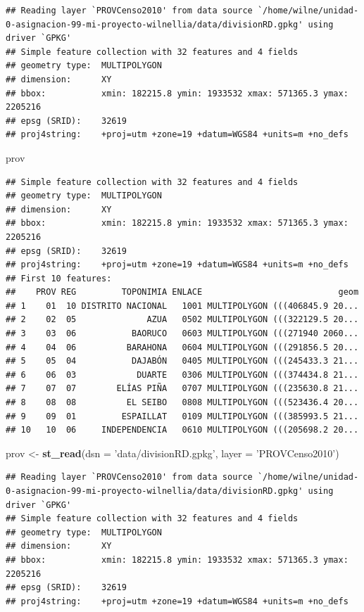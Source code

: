 \documentclass[11pt,]{article}
\newenvironment{Shaded}{\begin{snugshade}}{\end{snugshade}}
\newcommand{\KeywordTok}[1]{\textcolor[rgb]{0.13,0.29,0.53}{\textbf{#1}}}
\newcommand{\DataTypeTok}[1]{\textcolor[rgb]{0.13,0.29,0.53}{#1}}
\newcommand{\StringTok}[1]{\textcolor[rgb]{0.31,0.60,0.02}{#1}}
\newcommand{\NormalTok}[1]{#1}
\begin{document}
\begin{verbatim}
## Reading layer `PROVCenso2010' from data source `/home/wilne/unidad-0-asignacion-99-mi-proyecto-wilnellia/data/divisionRD.gpkg' using driver `GPKG'
## Simple feature collection with 32 features and 4 fields
## geometry type:  MULTIPOLYGON
## dimension:      XY
## bbox:           xmin: 182215.8 ymin: 1933532 xmax: 571365.3 ymax: 2205216
## epsg (SRID):    32619
## proj4string:    +proj=utm +zone=19 +datum=WGS84 +units=m +no_defs
\end{verbatim}

\begin{Shaded}
\begin{Highlighting}[]
\NormalTok{prov}
\end{Highlighting}
\end{Shaded}

\begin{verbatim}
## Simple feature collection with 32 features and 4 fields
## geometry type:  MULTIPOLYGON
## dimension:      XY
## bbox:           xmin: 182215.8 ymin: 1933532 xmax: 571365.3 ymax: 2205216
## epsg (SRID):    32619
## proj4string:    +proj=utm +zone=19 +datum=WGS84 +units=m +no_defs
## First 10 features:
##    PROV REG         TOPONIMIA ENLACE                           geom
## 1    01  10 DISTRITO NACIONAL   1001 MULTIPOLYGON (((406845.9 20...
## 2    02  05              AZUA   0502 MULTIPOLYGON (((322129.5 20...
## 3    03  06           BAORUCO   0603 MULTIPOLYGON (((271940 2060...
## 4    04  06          BARAHONA   0604 MULTIPOLYGON (((291856.5 20...
## 5    05  04           DAJABÓN   0405 MULTIPOLYGON (((245433.3 21...
## 6    06  03            DUARTE   0306 MULTIPOLYGON (((374434.8 21...
## 7    07  07        ELÍAS PIÑA   0707 MULTIPOLYGON (((235630.8 21...
## 8    08  08          EL SEIBO   0808 MULTIPOLYGON (((523436.4 20...
## 9    09  01         ESPAILLAT   0109 MULTIPOLYGON (((385993.5 21...
## 10   10  06     INDEPENDENCIA   0610 MULTIPOLYGON (((205698.2 20...
\end{verbatim}

\begin{Shaded}
\begin{Highlighting}[]
\NormalTok{prov <-}\StringTok{ }\KeywordTok{st_read}\NormalTok{(}\DataTypeTok{dsn =} \StringTok{'data/divisionRD.gpkg'}\NormalTok{, }\DataTypeTok{layer =} \StringTok{'PROVCenso2010'}\NormalTok{)}
\end{Highlighting}
\end{Shaded}

\begin{verbatim}
## Reading layer `PROVCenso2010' from data source `/home/wilne/unidad-0-asignacion-99-mi-proyecto-wilnellia/data/divisionRD.gpkg' using driver `GPKG'
## Simple feature collection with 32 features and 4 fields
## geometry type:  MULTIPOLYGON
## dimension:      XY
## bbox:           xmin: 182215.8 ymin: 1933532 xmax: 571365.3 ymax: 2205216
## epsg (SRID):    32619
## proj4string:    +proj=utm +zone=19 +datum=WGS84 +units=m +no_defs
\end{verbatim}
\end{document}
